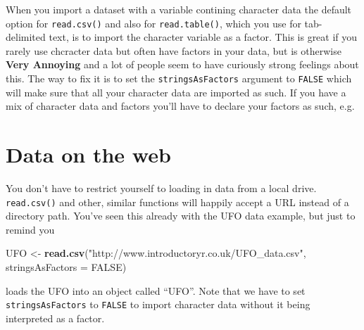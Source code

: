 \documentclass[
]{book}
\newenvironment{Shaded}{\begin{snugshade}}{\end{snugshade}}
\newcommand{\DataTypeTok}[1]{\textcolor[rgb]{0.13,0.29,0.53}{#1}}
\newcommand{\KeywordTok}[1]{\textcolor[rgb]{0.13,0.29,0.53}{\textbf{#1}}}
\newcommand{\NormalTok}[1]{#1}
\newcommand{\OperatorTok}[1]{\textcolor[rgb]{0.81,0.36,0.00}{\textbf{#1}}}
\newcommand{\OtherTok}[1]{\textcolor[rgb]{0.56,0.35,0.01}{#1}}
\newcommand{\StringTok}[1]{\textcolor[rgb]{0.31,0.60,0.02}{#1}}
\begin{document}
When you import a dataset with a variable contining character data the default option for \texttt{read.csv()} and also for \texttt{read.table()}, which you use for tab-delimited text, is to import the character variable as a factor. This is great if you rarely use chcracter data but often have factors in your data, but is otherwise \textbf{Very Annoying} and a lot of people seem to have curiously strong feelings about this. The way to fix it is to set the \texttt{stringsAsFactors} argument to \texttt{FALSE} which will make sure that all your character data are imported as such. If you have a mix of character data and factors you'll have to declare your factors as such, e.g.

\begin{Shaded}
\end{Shaded}

\hypertarget{data-on-the-web}{%
\section{Data on the web}\label{data-on-the-web}}

You don't have to restrict yourself to loading in data from a local drive. \texttt{read.csv()} and other, similar functions will happily accept a URL instead of a directory path. You've seen this already with the UFO data example, but just to remind you

\begin{Shaded}
\begin{Highlighting}[]
\NormalTok{UFO <-}\StringTok{ }\KeywordTok{read.csv}\NormalTok{(}\StringTok{"http://www.introductoryr.co.uk/UFO_data.csv"}\NormalTok{,}
                \DataTypeTok{stringsAsFactors =} \OtherTok{FALSE}\NormalTok{)}
\end{Highlighting}
\end{Shaded}

loads the UFO into an object called ``UFO''. Note that we have to set \texttt{stringsAsFactors} to \texttt{FALSE} to import character data without it being interpreted as a factor.
\end{document}
